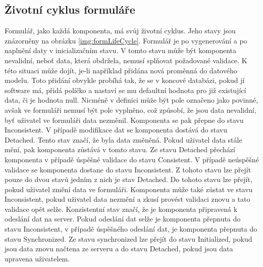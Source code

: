 \subsection{Životní cyklus formuláře}
Formulář, jako každá komponenta, má svůj životní cyklus. Jeho stavy jsou znázorněny na obrázku \ref{img:formLifeCycle}. Formulář je po vygenerování a po naplnění daty v inicializačním stavu. V tomto stavu může být komponenta nevalidní, neboť data, která obdržela, nemusí splňovat požadované validace. K této situaci může dojít, je-li například přidána nová proměnná do datového modelu. Toto přidání obvykle probíhá tak, že se v koncové databázi, pokud jí software má, přidá políčko a nastaví se mu defaultní hodnota pro již existující data, či je hodnota null. Nicméně v definici může být pole označeno jako povinné, avšak ve formuláři nemusí být pole vyplněno, což způsobí, že jsou data nevalidní, byť uživatel ve formuláři data nezměnil. Komponenta se pak přepne do stavu Inconsistent. V případě modifikace dat se komponenta dostává do stavu Detached. Tento stav značí, že byla data změněná. Pokud uživatel data stále mění, pak komponenta zůstává v tomto stavu. Ze stavu Detached přechází komponenta v případě úspěšné validace do stavu Consistent. V případě neúspěšné validace se komponenta dostane do stavu Inconsistent. Z tohoto stavu lze přejít pouze do dvou stavů jedním z nich je stav Detached. Do tohoto stavu lze přejít, pokud uživatel změní data ve formuláři. Komponenta může také zůstat ve stavu Inconsistent, pokud uživatel data nezmění a zkusí provést validaci znovu a tato validace opět selže. Konzistentní stav značí, že je komponenta připravená k odeslání dat na server. Pokud odeslání dat selže je komponenta přepnuta do stavu Inconsistent, v případě úspěšného odeslání dat, je komponenta přepnuta do stavu Synchronized. Ze stavu synchronized lze přejít do stavu Initialized, pokud jsou data znovu načtena ze serveru a do stavu Detached, pokud jsou data upravena uživatelem.


